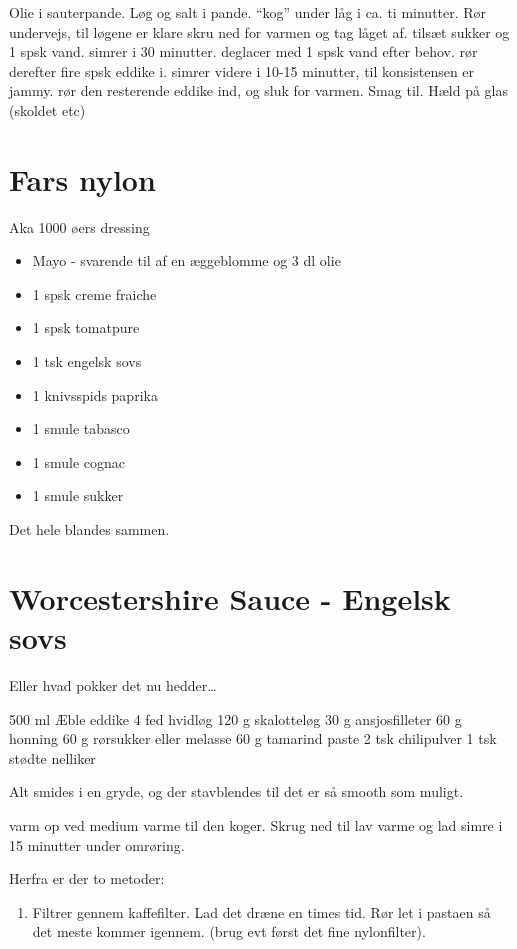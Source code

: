 \documentclass[
  letterpaper,
  DIV=11,
  numbers=noendperiod]{scrreprt}
\providecommand{\tightlist}{%
  \setlength{\itemsep}{0pt}\setlength{\parskip}{0pt}}\usepackage{longtable,booktabs,array}
\begin{document}
Olie i sauterpande. Løg og salt i pande. ``kog'' under låg i ca. ti
minutter. Rør undervejs, til løgene er klare skru ned for varmen og tag
låget af. tilsæt sukker og 1 spsk vand. simrer i 30 minutter. deglacer
med 1 spsk vand efter behov. rør derefter fire spsk eddike i. simrer
videre i 10-15 minutter, til konsistensen er jammy. rør den resterende
eddike ind, og sluk for varmen. Smag til. Hæld på glas (skoldet etc)

\hypertarget{fars-nylon}{%
\section{Fars nylon}\label{fars-nylon}}

Aka 1000 øers dressing

\begin{itemize}
\tightlist
\item
  Mayo - svarende til af en æggeblomme og 3 dl olie
\item
  1 spsk creme fraiche
\item
  1 spsk tomatpure
\item
  1 tsk engelsk sovs
\item
  1 knivsspids paprika
\item
  1 smule tabasco
\item
  1 smule cognac
\item
  1 smule sukker
\end{itemize}

Det hele blandes sammen.

\hypertarget{worcestershire-sauce---engelsk-sovs}{%
\section{Worcestershire Sauce - Engelsk
sovs}\label{worcestershire-sauce---engelsk-sovs}}

Eller hvad pokker det nu hedder\ldots{}

500 ml Æble eddike 4 fed hvidløg 120 g skalotteløg 30 g ansjosfilleter
60 g honning 60 g rørsukker eller melasse 60 g tamarind paste 2 tsk
chilipulver 1 tsk stødte nelliker

Alt smides i en gryde, og der stavblendes til det er så smooth som
muligt.

varm op ved medium varme til den koger. Skrug ned til lav varme og lad
simre i 15 minutter under omrøring.

Herfra er der to metoder:

\begin{enumerate}
\def\labelenumi{\arabic{enumi}.}
\tightlist
\item
  Filtrer gennem kaffefilter. Lad det dræne en times tid. Rør let i
  pastaen så det meste kommer igennem. (brug evt først det fine
  nylonfilter).
\end{enumerate}
\end{document}
